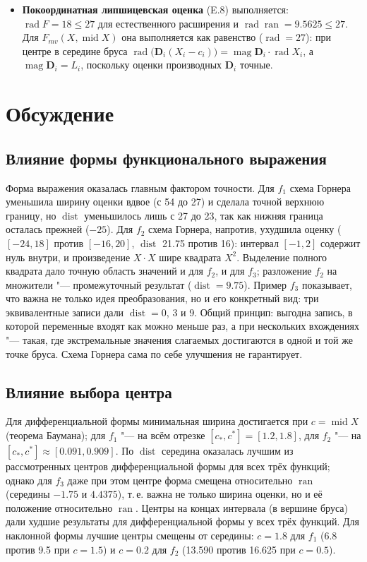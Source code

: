 \documentclass[12pt,a4paper]{article}
\newcommand{\ran}{\operatorname{ran}}
\newcommand{\rad}{\operatorname{rad}}
\newcommand{\Mid}{\operatorname{mid}}
\newcommand{\dist}{\operatorname{dist}}
\newcommand{\Mag}{\operatorname{mag}}
\begin{document}
\begin{itemize}
\item \textbf{Покоординатная липшицевская оценка} (E.8) выполняется: $\rad F=18\le27$ для естественного расширения и $\rad\ran=9.5625\le27$. Для $F_{mv}(X,\Mid X)$ она выполняется как равенство ($\rad=27$): при центре в середине бруса $\rad\bigl(\mathbf{D}_i(X_i-c_i)\bigr)=\Mag\mathbf{D}_i\cdot\rad X_i$, а $\Mag\mathbf{D}_i=L_i$, поскольку оценки производных $\mathbf{D}_i$ точные.
\end{itemize}

\section{Обсуждение}

\subsection*{Влияние формы функционального выражения}
Форма выражения оказалась главным фактором точности. Для $f_1$ схема Горнера уменьшила ширину оценки вдвое (с 54 до 27) и сделала точной верхнюю границу, но $\dist$ уменьшилось лишь с 27 до 23, так как нижняя граница осталась прежней ($-25$). Для $f_2$ схема Горнера, напротив, ухудшила оценку ($[-24,18]$ против $[-16,20]$, $\dist$ 21.75 против 16): интервал $[-1,2]$ содержит нуль внутри, и произведение $X\cdot X$ шире квадрата $X^2$. Выделение полного квадрата дало точную область значений и для $f_2$, и для $f_3$; разложение $f_2$ на множители "--- промежуточный результат ($\dist=9.75$). Пример $f_3$ показывает, что важна не только идея преобразования, но и его конкретный вид: три эквивалентные записи дали $\dist=0$, 3 и 9. Общий принцип: выгодна запись, в которой переменные входят как можно меньше раз, а при нескольких вхождениях "--- такая, где экстремальные значения слагаемых достигаются в одной и той же точке бруса. Схема Горнера сама по себе улучшения не гарантирует.

\subsection*{Влияние выбора центра}
Для дифференциальной формы минимальная ширина достигается при $c=\Mid X$ (теорема Баумана); для $f_1$ "--- на всём отрезке $[c_{*},c^{*}]=[1.2,1.8]$, для $f_2$ "--- на $[c_{*},c^{*}]\approx[0.091,0.909]$. По $\dist$ середина оказалась лучшим из рассмотренных центров дифференциальной формы для всех трёх функций; однако для $f_3$ даже при этом центре форма смещена относительно $\ran$ (середины $-1.75$ и $4.4375$), т.\,е. важна не только ширина оценки, но и её положение относительно $\ran$. Центры на концах интервала (в вершине бруса) дали худшие результаты для дифференциальной формы у всех трёх функций. Для наклонной формы лучшие центры смещены от середины: $c=1.8$ для $f_1$ (6.8 против 9.5 при $c=1.5$) и $c=0.2$ для $f_2$ (13.590 против 16.625 при $c=0.5$).
\end{document}
